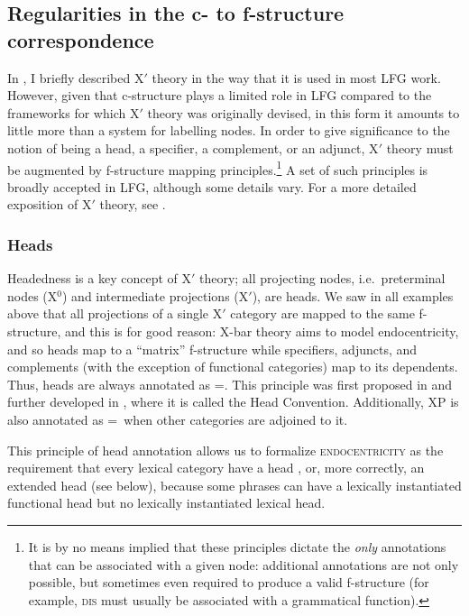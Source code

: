 \documentclass[output=paper,hidelinks]{langscibook}
\begin{document}
 \subsection{Regularities in the c- to f-structure correspondence\label{sect:regularities}}


 In , I briefly described X$'$ theory in the way that it is used in most LFG work. However, given that c-structure plays a limited role in LFG compared to the frameworks for which X$'$ theory was originally devised, in this form it amounts to little more than a system for labelling nodes. In order to give significance to the notion of being a head, a specifier, a complement, or an adjunct, X$'$ theory must be augmented by f-structure mapping principles.\footnote{It is by no means implied that these principles dictate the \textit{only} annotations that can be associated with a given node: additional annotations are not only possible, but sometimes even required to produce a valid f-structure (for example, \textsc{dis} must usually be associated with a grammatical function).} A set of such principles is broadly accepted in LFG, although some details vary. For a more detailed exposition of X$'$ theory, see  \textcite{DLM:LFG,BresnanEtAl2016}.
 
 \subsubsection{Heads}

 Headedness is a key concept of X$'$ theory; all projecting nodes, i.e.\ preterminal nodes (X$^0$) and intermediate projections (X$'$), are heads. We saw in all examples above that all projections of a single X$'$ category are mapped to the same f-structure, and this is for good reason: X-bar theory aims to model endocentricity, and so heads map to a ``matrix'' f-structure while specifiers, adjuncts, and complements (with the exception of functional categories) map to its dependents. Thus, heads are always annotated as \UP=\DOWN. This principle was first proposed in \textcite{bresnan1982control-complementation} and further developed in \textcite{zaenen1983}, where it is called the Head Convention.  Additionally, XP is also annotated as \UP=\DOWN\ when other categories are adjoined to it.
 
 This principle of head annotation allows us to formalize \textsc{endocentricity} as the requirement that every lexical category have a head \parencite{BresnanEtAl2016}, or, more correctly, an extended head (see below), because some phrases can have a lexically instantiated functional head but no lexically instantiated lexical head.
 
\end{document}
